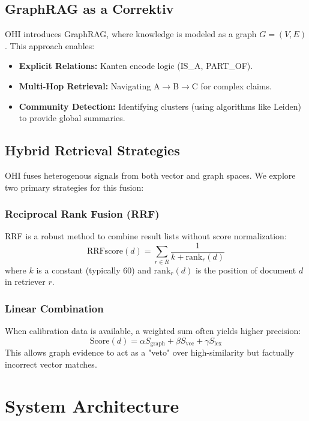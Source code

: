 \documentclass[10pt, a4paper, twocolumn]{article}
\begin{document}
\subsection{GraphRAG as a Correktiv}
OHI introduces GraphRAG, where knowledge is modeled as a graph $G=(V,E)$. This approach enables:
\begin{itemize}
    \item \textbf{Explicit Relations:} Kanten encode logic (IS\_A, PART\_OF).
    \item \textbf{Multi-Hop Retrieval:} Navigating A$\rightarrow$B$\rightarrow$C for complex claims.
    \item \textbf{Community Detection:} Identifying clusters (using algorithms like Leiden) to provide global summaries.
\end{itemize}

\subsection{Hybrid Retrieval Strategies}
OHI fuses heterogenous signals from both vector and graph spaces. We explore two primary strategies for this fusion:

\subsubsection{Reciprocal Rank Fusion (RRF)}
RRF is a robust method to combine result lists without score normalization:
\begin{equation}
    \text{RRFscore}(d) = \sum_{r \in R} \frac{1}{k + \text{rank}_r(d)}
\end{equation}
where $k$ is a constant (typically 60) and $\text{rank}_r(d)$ is the position of document $d$ in retriever $r$.

\subsubsection{Linear Combination}
When calibration data is available, a weighted sum often yields higher precision:
\begin{equation}
    \text{Score}(d) = \alpha S_{\text{graph}} + \beta S_{\text{vec}} + \gamma S_{\text{lex}}
\end{equation}
This allows graph evidence to act as a "veto" over high-similarity but factually incorrect vector matches.

\section{System Architecture}
\end{document}
